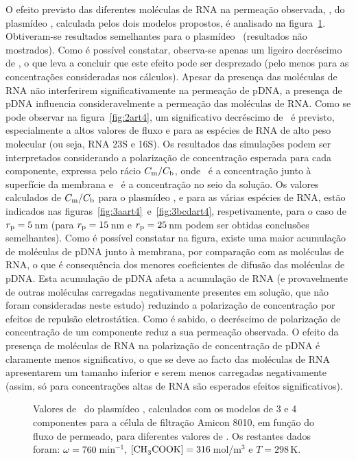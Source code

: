 O efeito previsto das diferentes moléculas de RNA na permeação observada, \permobs, do plasmídeo \pVAX, calculada pelos dois modelos propostos, é analisado na figura~\ref{fig:1abcart4}. Obtiveram-se resultados semelhantes para o plasmídeo \pCAMBIA\ (resultados não mostrados).
%
%
Como é possível constatar, observa-se apenas um ligeiro decréscimo de \permobs, o que leva a concluir que este efeito pode ser desprezado (pelo menos para as concentrações consideradas nos cálculos). Apesar da presença das moléculas de RNA não interferirem significativamente na permeação de pDNA, a presença de pDNA influencia consideravelmente a permeação das moléculas de RNA. Como se pode observar na figura~\ref{fig:2art4}, um significativo decréscimo de \permobs\ é previsto, especialmente a altos valores de fluxo e para as espécies de RNA de alto peso molecular (ou seja, RNA 23S e 16S).
%
Os resultados das simulações podem ser interpretados considerando a polarização de concentração esperada para cada componente, expressa pelo rácio $C_{\mathrm{m}}/C_{\mathrm{b}}$, onde \concm\ é a concentração junto à superfície da membrana e \concb\ é a concentração no seio da solução. Os valores calculados de $C_{\mathrm{m}}/C_{\mathrm{b}}$ para o plasmídeo \pVAX, e para as várias espécies de RNA, estão indicados nas figuras~\ref{fig:3aart4}~e~\ref{fig:3bcdart4}, respetivamente, para o caso de $r_{\mathrm{p}}=5$\,nm (para $r_{\mathrm{p}}=15$\,nm e $r_{\mathrm{p}}=25$\,nm podem ser obtidas conclusões semelhantes). Como é possível constatar na figura, existe uma maior acumulação de moléculas de pDNA junto à membrana, por comparação com as moléculas de RNA, o que é consequência dos menores coeficientes de difusão das moléculas de pDNA. Esta acumulação de pDNA afeta a acumulação de RNA (e provavelmente de outras moléculas carregadas negativamente presentes em solução, que não foram consideradas neste estudo) reduzindo a polarização de concentração por efeitos de repulsão eletrostática.
%
Como é sabido, o decréscimo de polarização de concentração de um componente reduz a sua permeação observada. O efeito da presença de moléculas de RNA na polarização de concentração de pDNA é claramente menos significativo, o que se deve ao facto das moléculas de RNA apresentarem um tamanho inferior e serem menos carregadas negativamente (assim, só para concentrações altas de RNA são esperados efeitos significativos).
\begin{figure}
	\centering
	
	\caption[Valores calculados de \permobs\ do plasmídeo \pVAX]{Valores de \permobs\ do plasmídeo \pVAX, calculados com os modelos de 3 e 4 componentes para a célula de filtração Amicon 8010, em função do fluxo de permeado, para diferentes valores de \raioporo. Os restantes dados foram: $\omega=760$\,min$^{-1}$, $[\ce{CH3COOK}]=316$\,mol/m$^3$ e $T=298$\,K.}
	\label{fig:1abcart4}  
\end{figure}
